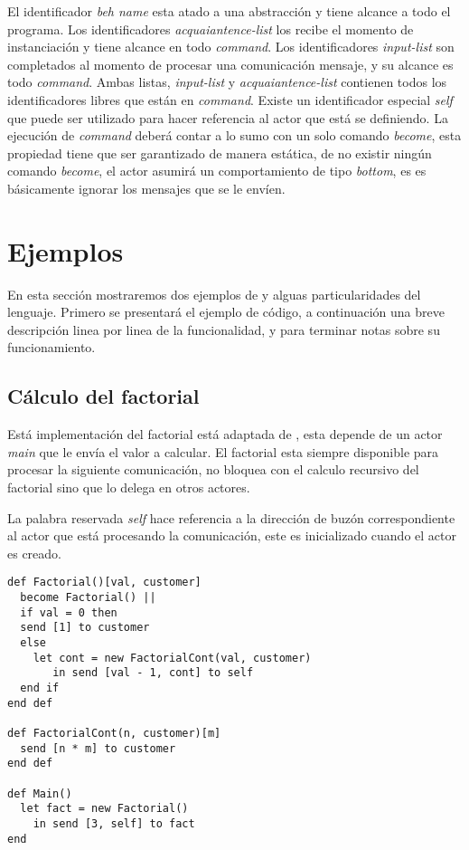El identificador \textit{beh name} esta atado a una abstracción y tiene alcance
a todo el programa. Los identificadores \textit{acquaiantence-list} los recibe el
momento de instanciación y tiene alcance en todo \textit{command}. Los
identificadores \textit{input-list} son completados al momento de procesar una comunicación
mensaje, y su alcance es todo \textit{command}. 
Ambas listas, \textit{input-list} y \textit{acquaiantence-list} contienen todos
los identificadores libres que están en \textit{command}. Existe un
identificador especial \textit{self} que puede ser utilizado para hacer
referencia al actor que está se definiendo. 
La ejecución de \textit{command} deberá contar a lo sumo con un solo comando
\textit{become}, esta propiedad tiene que ser garantizado de manera estática, de no
existir ningún comando \textit{become}, el actor asumirá un comportamiento de
tipo \textit{bottom}, es es básicamente ignorar los mensajes que se le envíen.


\section{Ejemplos}

En esta sección mostraremos dos ejemplos de \SAL y alguas particularidades del lenguaje. 
Primero se presentará el ejemplo de código, a continuación una breve descripción linea por linea de la funcionalidad, 
y para terminar notas sobre su funcionamiento.

\subsection{Cálculo del factorial}

Está implementación del factorial está adaptada de \cite{Agha:1986:AMC:7929}, esta
depende de un actor \textit{main} que le envía el valor a calcular. El factorial
esta siempre disponible para procesar la siguiente comunicación, no bloquea con
el calculo recursivo del factorial sino que lo delega en otros actores.

La palabra reservada \textit{self} hace referencia a la dirección de buzón
correspondiente al actor que está procesando la comunicación, este es inicializado
cuando el actor es creado.

\begin{lstlisting}[language=sal, style=simple]
def Factorial()[val, customer]
  become Factorial() ||
  if val = 0 then
  send [1] to customer
  else
    let cont = new FactorialCont(val, customer)
       in send [val - 1, cont] to self
  end if 
end def

def FactorialCont(n, customer)[m] 
  send [n * m] to customer
end def

def Main() 
  let fact = new Factorial() 
    in send [3, self] to fact
end
\end{lstlisting}

